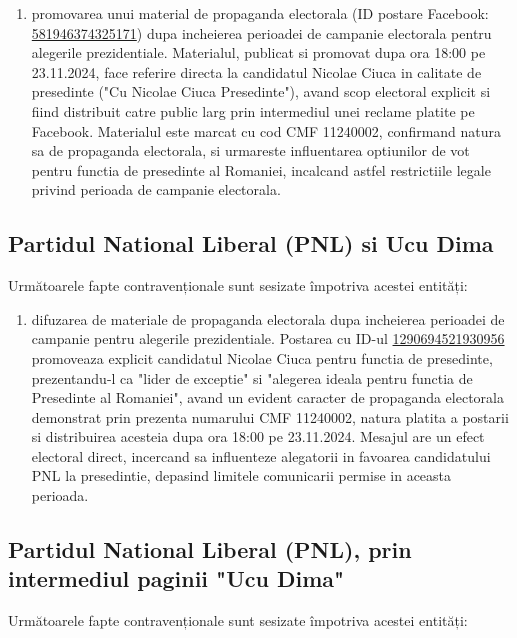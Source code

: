 \documentclass[a4paper,12pt]{article}
\begin{document}
\begin{enumerate}[leftmargin=*, label=\arabic*.)]
    \item promovarea unui material de propaganda electorala (ID postare Facebook: \href{https://www.facebook.com/ads/library/?id=581946374325171}{581946374325171}) dupa incheierea perioadei de campanie electorala pentru alegerile prezidentiale. Materialul, publicat si promovat dupa ora 18:00 pe 23.11.2024, face referire directa la candidatul Nicolae Ciuca in calitate de presedinte ("Cu Nicolae Ciuca Presedinte"), avand scop electoral explicit si fiind distribuit catre public larg prin intermediul unei reclame platite pe Facebook. Materialul este marcat cu cod CMF 11240002, confirmand natura sa de propaganda electorala, si urmareste influentarea optiunilor de vot pentru functia de presedinte al Romaniei, incalcand astfel restrictiile legale privind perioada de campanie electorala.
\end{enumerate}

\vspace{0.5cm}

\subsection{Partidul National Liberal (PNL) si Ucu Dima}
Următoarele fapte contravenționale sunt sesizate împotriva acestei entități:

\begin{enumerate}[leftmargin=*, label=\arabic*.)]
    \item difuzarea de materiale de propaganda electorala dupa incheierea perioadei de campanie pentru alegerile prezidentiale. Postarea cu ID-ul \href{https://www.facebook.com/ads/library/?id=1290694521930956}{1290694521930956} promoveaza explicit candidatul Nicolae Ciuca pentru functia de presedinte, prezentandu-l ca "lider de exceptie" si "alegerea ideala pentru functia de Presedinte al Romaniei", avand un evident caracter de propaganda electorala demonstrat prin prezenta numarului CMF 11240002, natura platita a postarii si distribuirea acesteia dupa ora 18:00 pe 23.11.2024. Mesajul are un efect electoral direct, incercand sa influenteze alegatorii in favoarea candidatului PNL la presedintie, depasind limitele comunicarii permise in aceasta perioada.
\end{enumerate}

\vspace{0.5cm}

\subsection{Partidul National Liberal (PNL), prin intermediul paginii "Ucu Dima"}
Următoarele fapte contravenționale sunt sesizate împotriva acestei entități:
\end{document}
